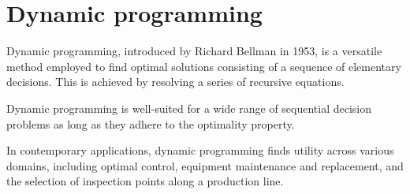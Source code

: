 \section{Dynamic programming}

Dynamic programming, introduced by Richard Bellman in 1953, is a versatile method employed to find optimal solutions consisting of a sequence of elementary decisions.
This is achieved by resolving a series of recursive equations.

Dynamic programming is well-suited for a wide range of sequential decision problems as long as they adhere to the optimality property.

In contemporary applications, dynamic programming finds utility across various domains, including optimal control, equipment maintenance and replacement, and the selection of inspection points along a production line.